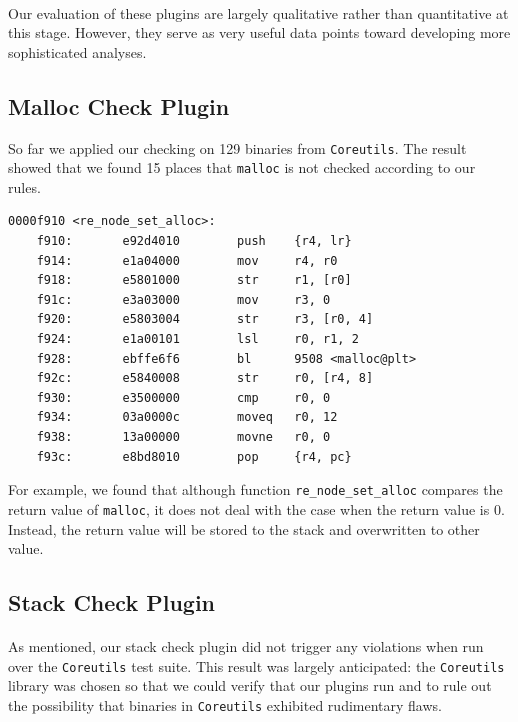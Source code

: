\documentclass[letterpaper,11pt]{article}
\begin{document}
\paragraph{}
Our evaluation of these plugins are largely qualitative rather than
quantitative at this stage. However, they serve as very useful data points
toward developing more sophisticated analyses.

\subsection{Malloc Check Plugin}
So far we applied our checking on 129 binaries from \texttt{Coreutils}. The
result showed that we found 15 places that \texttt{malloc} is not checked
according to our rules.
\begin{center}
\lstset{language=C, label=strcpy,
caption=Function re\_node\_set\_alloc, breaklines=true, basicstyle=\tiny, numbers=none}
\begin{lstlisting}
0000f910 <re_node_set_alloc>:
    f910:       e92d4010        push    {r4, lr}
    f914:       e1a04000        mov     r4, r0
    f918:       e5801000        str     r1, [r0]
    f91c:       e3a03000        mov     r3, 0
    f920:       e5803004        str     r3, [r0, 4]
    f924:       e1a00101        lsl     r0, r1, 2
    f928:       ebffe6f6        bl      9508 <malloc@plt>
    f92c:       e5840008        str     r0, [r4, 8]
    f930:       e3500000        cmp     r0, 0
    f934:       03a0000c        moveq   r0, 12
    f938:       13a00000        movne   r0, 0
    f93c:       e8bd8010        pop     {r4, pc}
\end{lstlisting}
\end{center}
For example, we found that although function \texttt{re\_node\_set\_alloc}
compares the return value of \texttt{malloc}, it does not deal with the case
when the return value is 0. Instead, the return value will be stored to the
stack and overwritten to other value.

\subsection{Stack Check Plugin}

\paragraph{}
As mentioned, our stack check plugin did not trigger any violations when run
over the \texttt{Coreutils} test suite. This result was largely anticipated:
the \texttt{Coreutils} library was chosen so that we could verify that our
plugins run and to rule out the possibility that binaries in \texttt{Coreutils}
exhibited rudimentary flaws.
\end{document}
